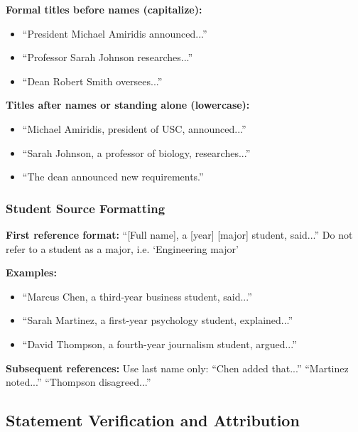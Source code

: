 \documentclass[12pt]{article}
\begin{document}
\begin{afterbox}
\textbf{Formal titles before names (capitalize):}
\begin{itemize}
    \item ``President Michael Amiridis announced...''
    \item ``Professor Sarah Johnson researches...''
    \item ``Dean Robert Smith oversees...''
\end{itemize}
\end{afterbox}

\begin{afterbox}
\textbf{Titles after names or standing alone (lowercase):}
\begin{itemize}
    \item ``Michael Amiridis, president of USC, announced...''
    \item ``Sarah Johnson, a professor of biology, researches...''
    \item ``The dean announced new requirements.''
\end{itemize}
\end{afterbox}

\subsubsection{Student Source Formatting}

\begin{examplebox}
\textbf{First reference format:}
``[Full name], a [year] [major] student, said...'' Do not refer to a student as a major, i.e. `Engineering major'

\textbf{Examples:}
\begin{itemize}
    \item ``Marcus Chen, a third-year business student, said...''
    \item ``Sarah Martinez, a first-year psychology student, explained...''
    \item ``David Thompson, a fourth-year journalism student, argued...''
\end{itemize}

\textbf{Subsequent references:}
Use last name only: ``Chen added that...'' ``Martinez noted...'' ``Thompson disagreed...''
\end{examplebox}

\newpage
\subsection{Statement Verification and Attribution}
\label{sec:statement-verification}
\end{document}
